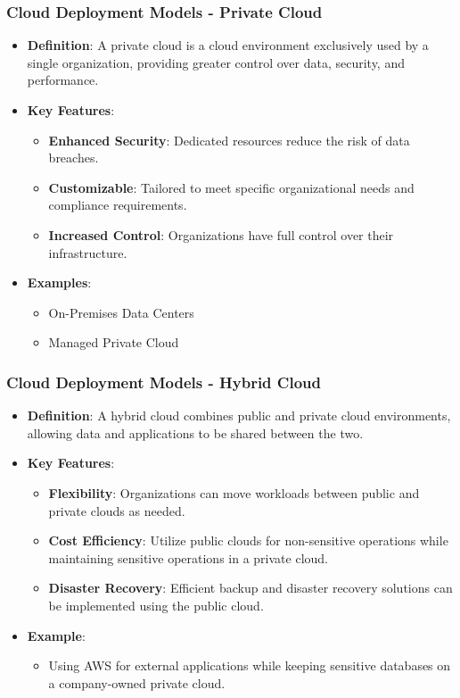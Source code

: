 \documentclass[aspectratio=169]{beamer}
\begin{document}
\begin{frame}[fragile]
    \frametitle{Cloud Deployment Models - Private Cloud}
    \begin{itemize}
        \item \textbf{Definition}: A private cloud is a cloud environment exclusively used by a single organization, providing greater control over data, security, and performance.
        \item \textbf{Key Features}:
            \begin{itemize}
                \item \textbf{Enhanced Security}: Dedicated resources reduce the risk of data breaches.
                \item \textbf{Customizable}: Tailored to meet specific organizational needs and compliance requirements.
                \item \textbf{Increased Control}: Organizations have full control over their infrastructure.
            \end{itemize}
        \item \textbf{Examples}:
            \begin{itemize}
                \item On-Premises Data Centers
                \item Managed Private Cloud
            \end{itemize}
    \end{itemize}
\end{frame}

\begin{frame}[fragile]
    \frametitle{Cloud Deployment Models - Hybrid Cloud}
    \begin{itemize}
        \item \textbf{Definition}: A hybrid cloud combines public and private cloud environments, allowing data and applications to be shared between the two.
        \item \textbf{Key Features}:
            \begin{itemize}
                \item \textbf{Flexibility}: Organizations can move workloads between public and private clouds as needed.
                \item \textbf{Cost Efficiency}: Utilize public clouds for non-sensitive operations while maintaining sensitive operations in a private cloud.
                \item \textbf{Disaster Recovery}: Efficient backup and disaster recovery solutions can be implemented using the public cloud.
            \end{itemize}
        \item \textbf{Example}:
            \begin{itemize}
                \item Using AWS for external applications while keeping sensitive databases on a company-owned private cloud.
            \end{itemize}
    \end{itemize}
\end{frame}
\end{document}

